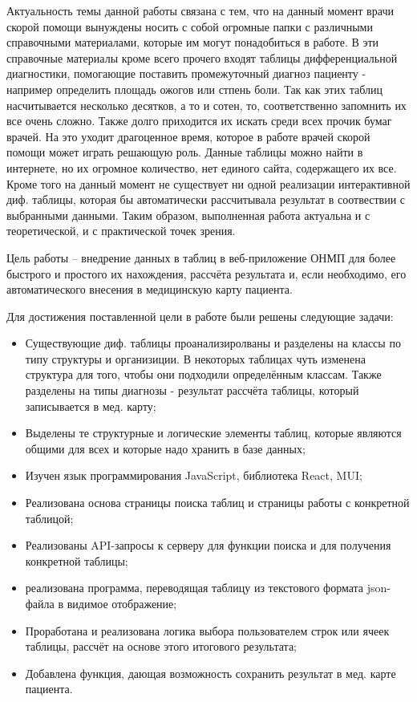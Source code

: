 \introduction %

Актуальность темы данной работы связана с тем, что на данный момент врачи скорой помощи вынуждены носить  с собой огромные папки с различными справочными материалами, которые им могут понадобиться в работе. В эти справочные материалы кроме всего прочего входят таблицы дифференциальной диагностики, помогающие поставить промежуточный диагноз пациенту - например определить площадь ожогов или стпень боли. Так как этих таблиц насчитывается несколько десятков, а то и сотен, то, соответственно запомнить их все очень сложно. Также долго приходится их искать среди всех прочик бумаг врачей. На это уходит драгоценное время, которое в работе врачей скорой помощи может играть решающую роль. Данные таблицы можно найти в интернете, но их огромное количество, нет единого сайта, содержащего их все. Кроме того на данный момент не существует ни одной реализации интерактивной диф. таблицы, которая бы автоматически рассчитывала результат в соотвествии с выбранными данными. Таким образом, выполненная работа актуальна и с теоретической, и с практической точек зрения.

Цель работы – внедрение данных в таблиц в веб-приложение ОНМП для более быстрого и простого их нахождения, рассчёта результата и, если необходимо, его автоматического внесения в медицинскую карту пациента.

Для достижения поставленной цели в работе были решены следующие задачи:

\begin{itemize}
\item Существующие диф. таблицы проанализиролваны и разделены на классы по типу структуры и организиции. В некоторых таблицах чуть изменена структура для того, чтобы они подходили определённым классам. Также разделены на типы диагнозы - результат рассчёта таблицы, который записывается в мед. карту;
\item Выделены те структурные и логические элементы таблиц, которые являются общими для всех и которые надо хранить в базе данных;
\item Изучен язык программирования JavaScript, библиотека React, MUI; 
\item Реализована основа страницы поиска таблиц и страницы работы с конкретной таблицой;
\item Реализованы API-запросы к серверу для функции поиска и для получения конкретной таблицы;
\item реализована программа, переводящая таблицу из текстового формата json-файла в видимое отображение;
\item Проработана и реализована логика выбора пользователем строк или ячеек таблицы, рассчёт на основе этого итогового результата;
\item Добавлена функция, дающая возможность сохранить результат в мед. карте пациента.
\end{itemize}

